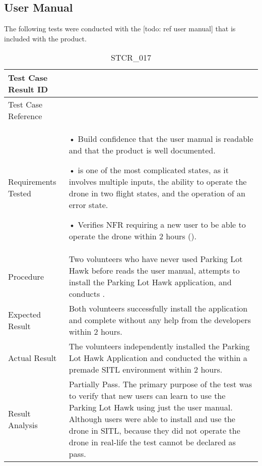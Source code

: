 \documentclass[12pt, titlepage]{article}
\begin{document}
\subsection{User Manual}
The following tests were conducted with the [todo: ref user manual] that is included with the product.

\begin{table}[!h]
\begin{center}
\caption {STCR\_017}
\label{tab:STCR_017}
\begin{tabular}{ | m{3.2cm} | m{12.2cm} | } 
\hline
Test Case Result ID & \nameref{tab:STCR_017} \\ 
\hline
Test Case Reference & \nameref{tab:STC_017}  \\ 
\hline
Requirements Tested &  • Build confidence that the user manual is readable and that the product is well documented.

• \nameref{tab:STC_012} is one of the most complicated states, as it involves multiple inputs, the ability to operate the drone in two flight states, and the operation of an error state. 

• Verifies NFR requiring a new user to be able to operate the drone within 2 hours (\nameref{USE_004}). 
\\ 
\hline
Procedure & Two volunteers who have never used Parking Lot Hawk before reads the user manual, attempts to install the Parking Lot Hawk application, and conducts \nameref{tab:STC_012}. \\
\hline
Expected Result & Both volunteers successfully install the application and complete \nameref{tab:STC_012} without any help from the developers within 2 hours.  \\ 
\hline
Actual Result &  The volunteers independently installed the Parking Lot Hawk Application and conducted the \nameref{tab:STC_012} within a premade SITL environment within 2 hours. \\
\hline
Result Analysis & Partially Pass. The primary purpose of the test was to verify that new users can learn to use the Parking Lot Hawk using just the user manual. Although users were able to install and use the drone in SITL, because they did not operate the drone in real-life the test cannot be declared as pass.    \\ 
\hline
\end{tabular}
\end{center}
\end{table}
\end{document}

